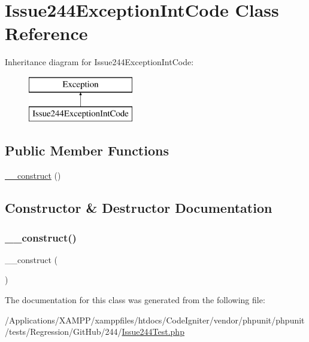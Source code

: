 \hypertarget{class_issue244_exception_int_code}{}\section{Issue244\+Exception\+Int\+Code Class Reference}
\label{class_issue244_exception_int_code}
Inheritance diagram for Issue244\+Exception\+Int\+Code\+:\begin{figure}[H]
\begin{center}
\leavevmode
\includegraphics[height=2.000000cm]{class_issue244_exception_int_code}
\end{center}
\end{figure}
\subsection*{Public Member Functions}
\begin{DoxyCompactItemize}
\item 
\mbox{\hyperlink{class_issue244_exception_int_code_a095c5d389db211932136b53f25f39685}{\+\_\+\+\_\+construct}} ()
\end{DoxyCompactItemize}


\subsection{Constructor \& Destructor Documentation}
\mbox{\label{class_issue244_exception_int_code_a095c5d389db211932136b53f25f39685}} 
\subsubsection{\texorpdfstring{\+\_\+\+\_\+construct()}{\_\_construct()}}
{\footnotesize\ttfamily \+\_\+\+\_\+construct (\begin{DoxyParamCaption}{ }\end{DoxyParamCaption})}



The documentation for this class was generated from the following file\+:\begin{DoxyCompactItemize}
\item 
/\+Applications/\+X\+A\+M\+P\+P/xamppfiles/htdocs/\+Code\+Igniter/vendor/phpunit/phpunit/tests/\+Regression/\+Git\+Hub/244/\mbox{\hyperlink{_issue244_test_8php}{Issue244\+Test.\+php}}\end{DoxyCompactItemize}
